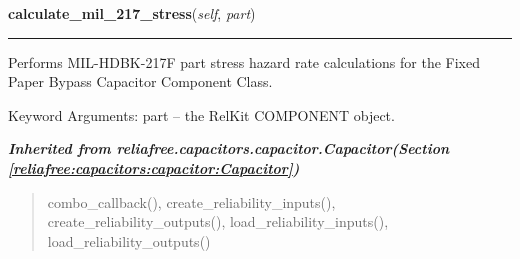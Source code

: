 \hspace{.8\funcindent}\begin{boxedminipage}{\funcwidth}

    \raggedright \textbf{calculate\_mil\_217\_stress}(\textit{self}, \textit{part})

    \vspace{-1.5ex}

    \rule{\textwidth}{0.5\fboxrule}
\setlength{\parskip}{2ex}
    Performs MIL-HDBK-217F part stress hazard rate calculations for the 
    Fixed Paper Bypass Capacitor Component Class.

    Keyword Arguments: part -- the RelKit COMPONENT object.

\setlength{\parskip}{1ex}
    \end{boxedminipage}


\large{\textbf{\textit{Inherited from reliafree.capacitors.capacitor.Capacitor\textit{(Section \ref{reliafree:capacitors:capacitor:Capacitor})}}}}

\begin{quote}
combo\_callback(), create\_reliability\_inputs(), create\_reliability\_outputs(), load\_reliability\_inputs(), load\_reliability\_outputs()
\end{quote}

